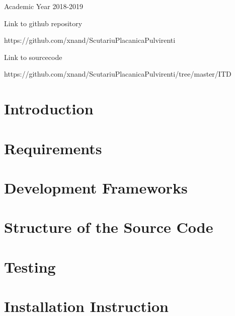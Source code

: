 \documentclass{article}
\begin{document}
\begin{center}
	\vspace{3mm}
	Academic Year 2018-2019

	\vspace{3mm}
	Link to github repository

	https://github.com/xnand/ScutariuPlacanicaPulvirenti

	\vspace{3mm}
	Link to sourcecode

	https://github.com/xnand/ScutariuPlacanicaPulvirenti/tree/master/ITD

	\end{center}

\newpage

\tableofcontents

\newpage

\section{Introduction}


\newpage

\section{Requirements}


\newpage

\section{Development Frameworks}



\newpage

\section{Structure of the Source Code}

\newpage

\section{Testing}

\newpage

\section{Installation Instruction}

\end{document}
